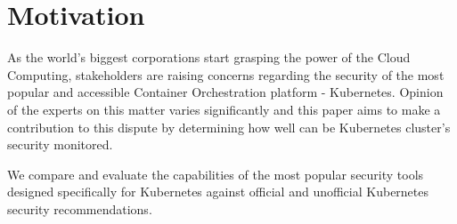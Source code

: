 \chapter*{Motivation}

As the world's biggest corporations start grasping the power of the Cloud Computing, stakeholders are raising concerns regarding the security of the most popular and accessible Container Orchestration platform - Kubernetes. Opinion of the experts on this matter varies significantly and this paper aims to make a contribution to this dispute by determining how well can be Kubernetes cluster's security monitored.

We compare and evaluate the capabilities of the most popular security tools designed specifically for Kubernetes against official and unofficial Kubernetes security recommendations.




